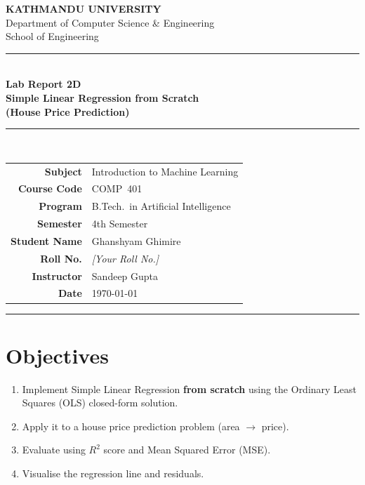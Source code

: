 \documentclass[12pt,a4paper]{article}
\begin{document}
\begin{center}
  {\Large\bfseries\color{kuBlue} KATHMANDU UNIVERSITY}\\[4pt]
  {\normalsize Department of Computer Science \& Engineering}\\[2pt]
  {\normalsize School of Engineering}\\[10pt]
  \rule{\linewidth}{1.5pt}\\[6pt]
  {\large\bfseries Lab Report 2D}\\[4pt]
  {\LARGE\bfseries Simple Linear Regression from Scratch\\[4pt](House Price Prediction)}\\[4pt]
  \rule{\linewidth}{0.8pt}\\[10pt]
\end{center}

\begin{center}
\renewcommand{\arraystretch}{1.4}
\begin{tabular}{r l}
  \textbf{Subject}      & Introduction to Machine Learning \\
  \textbf{Course Code}  & COMP~401 \\
  \textbf{Program}      & B.Tech.\ in Artificial Intelligence \\
  \textbf{Semester}     & 4th Semester \\
  \textbf{Student Name} & Ghanshyam Ghimire \\
  \textbf{Roll No.}     & \textit{[Your Roll No.]} \\
  \textbf{Instructor}   & Sandeep Gupta \\
  \textbf{Date}         & \today \\
\end{tabular}
\end{center}
\vspace{10pt}\hrule\vspace{16pt}

\section{Objectives}
\begin{enumerate}[label=\arabic*.]
  \item Implement Simple Linear Regression \textbf{from scratch} using the Ordinary Least Squares (OLS) closed-form solution.
  \item Apply it to a house price prediction problem (area $\to$ price).
  \item Evaluate using $R^2$ score and Mean Squared Error (MSE).
  \item Visualise the regression line and residuals.
\end{enumerate}
\end{document}
